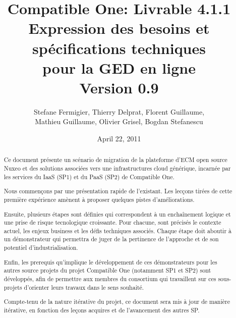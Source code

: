 \documentclass[a4paper,11pt]{article}
\title{Compatible One: Livrable 4.1.1\\
Expression des besoins et spécifications techniques\\
pour la GED en ligne\\
Version 0.9}
\date{April 22, 2011}
\author{Stefane Fermigier, Thierry Delprat, Florent Guillaume,\\
Mathieu Guillaume, Olivier Grisel, Bogdan Stefanescu}
\begin{document}
\maketitle
\tableofcontents

\pagebreak

\begin{abstract}
  Ce document présente un scénario de migration de la plateforme d'ECM open source Nuxeo et des solutions associées vers une infrastructures cloud générique, incarnée par les services du IaaS (SP1) et du PaaS (SP2) de Compatible One.
  
  Nous commençons par une présentation rapide de l'existant. Les lecçons tirées de cette première expérience amènent à proposer quelques pistes d'améliorations.
  
  Ensuite, plusieurs étapes sont définies qui correspondent à un enchaînement logique et une prise de risque tecnologique croissante. Pour chacune, sont précisés le contexte actuel, les enjeux business et les défis techniques associés. Chaque étape doit aboutir à un démonstrateur qui permettra de juger de la pertinence de l'approche et de son potentiel d'industrialisation.
  
  Enfin, les prerequis qu'implique le développement de ces démonstrateurs pour les autres source projets du projet Compatible One (notamment SP1 et SP2) sont développés, afin de permettre aux membres du consortium qui travaillent sur ces sous-projets d'orienter leurs travaux dans le sens souhaité.

  Compte-tenu de la nature itérative du projet, ce document sera mis à jour de manière itérative, en fonction des leçons acquires et de l'avancement des autres SP.
\end{abstract}




\end{document}
